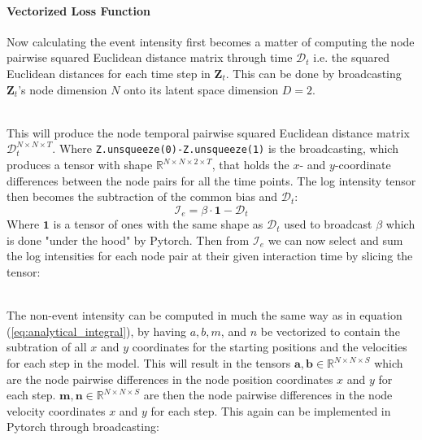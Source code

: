 \paragraph{Vectorized Loss Function}
Now calculating the event intensity first becomes a matter of computing the node pairwise squared Euclidean distance matrix through time $\boldsymbol{\mathcal{D}}_t$ i.e. the squared Euclidean distances for each time step in $\textbf{Z}_t$. This can be done by broadcasting $\textbf{Z}_t$'s node dimension $N$ onto its latent space dimension $D=2$.

\\
This will produce the node temporal pairwise squared Euclidean distance matrix $\boldsymbol{\mathcal{D}}_t^{N \times N \times T}$.
Where \texttt{Z.unsqueeze(0)-Z.unsqueeze(1)} is the broadcasting, which produces a tensor with shape $\mathbb{R}^{N \times N \times 2 \times T}$, that holds the $x$- and $y$-coordinate differences between the node pairs for all the time points. 
The log intensity tensor then becomes the subtraction of the common bias and $\boldsymbol{\mathcal{D}}_t$:
\begin{equation}
    \boldsymbol{\mathcal{I}}_e = \beta \cdot \textbf{1} - \boldsymbol{\mathcal{D}}_t
\end{equation}
Where $\textbf{1}$ is a tensor of ones with the same shape as $\boldsymbol{\mathcal{D}}_t$ used to broadcast $\beta$ which is done "under the hood" by Pytorch. Then from $\boldsymbol{\mathcal{I}}_e$ we can now select and sum the log intensities for each node pair at their given interaction time by slicing the tensor:

\\
The non-event intensity can be computed in much the same way as in equation (\ref{eq:analytical_integral}), by having $a, b, m$, and $n$ be vectorized to contain the subtration of all $x$ and $y$ coordinates for the starting positions and the velocities for each step in the model. This will result in the tensors $\textbf{a}, \textbf{b} \in \mathbb{R}^{N \times N \times S}$ which are the node pairwise differences in the node position coordinates $x$ and $y$ for each step. $\textbf{m}, \textbf{n} \in \mathbb{R}^{N \times N \times S}$ are then the node pairwise differences in the node velocity coordinates $x$ and $y$ for each step. This again can be implemented in Pytorch through broadcasting: 



